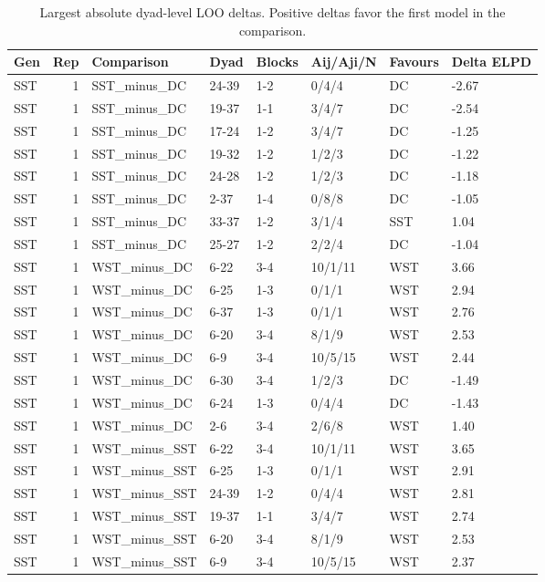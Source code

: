 \begin{table}[!h]
\centering
\caption{Largest absolute dyad-level LOO deltas. Positive deltas favor the first model in the comparison.}
\centering
\begin{tabular}[t]{lrllllll}
\toprule
Gen & Rep & Comparison & Dyad & Blocks & Aij/Aji/N & Favours & Delta ELPD\\
\midrule
SST & 1 & SST_minus_DC & 24-39 & 1-2 & 0/4/4 & DC & -2.67\\
SST & 1 & SST_minus_DC & 19-37 & 1-1 & 3/4/7 & DC & -2.54\\
SST & 1 & SST_minus_DC & 17-24 & 1-2 & 3/4/7 & DC & -1.25\\
SST & 1 & SST_minus_DC & 19-32 & 1-2 & 1/2/3 & DC & -1.22\\
SST & 1 & SST_minus_DC & 24-28 & 1-2 & 1/2/3 & DC & -1.18\\
\addlinespace
SST & 1 & SST_minus_DC & 2-37 & 1-4 & 0/8/8 & DC & -1.05\\
SST & 1 & SST_minus_DC & 33-37 & 1-2 & 3/1/4 & SST & 1.04\\
SST & 1 & SST_minus_DC & 25-27 & 1-2 & 2/2/4 & DC & -1.04\\
SST & 1 & WST_minus_DC & 6-22 & 3-4 & 10/1/11 & WST & 3.66\\
SST & 1 & WST_minus_DC & 6-25 & 1-3 & 0/1/1 & WST & 2.94\\
\addlinespace
SST & 1 & WST_minus_DC & 6-37 & 1-3 & 0/1/1 & WST & 2.76\\
SST & 1 & WST_minus_DC & 6-20 & 3-4 & 8/1/9 & WST & 2.53\\
SST & 1 & WST_minus_DC & 6-9 & 3-4 & 10/5/15 & WST & 2.44\\
SST & 1 & WST_minus_DC & 6-30 & 3-4 & 1/2/3 & DC & -1.49\\
SST & 1 & WST_minus_DC & 6-24 & 1-3 & 0/4/4 & DC & -1.43\\
\addlinespace
SST & 1 & WST_minus_DC & 2-6 & 3-4 & 2/6/8 & WST & 1.40\\
SST & 1 & WST_minus_SST & 6-22 & 3-4 & 10/1/11 & WST & 3.65\\
SST & 1 & WST_minus_SST & 6-25 & 1-3 & 0/1/1 & WST & 2.91\\
SST & 1 & WST_minus_SST & 24-39 & 1-2 & 0/4/4 & WST & 2.81\\
SST & 1 & WST_minus_SST & 19-37 & 1-1 & 3/4/7 & WST & 2.74\\
\addlinespace
SST & 1 & WST_minus_SST & 6-20 & 3-4 & 8/1/9 & WST & 2.53\\
SST & 1 & WST_minus_SST & 6-9 & 3-4 & 10/5/15 & WST & 2.37\\

\end{tabular}
\end{table}
